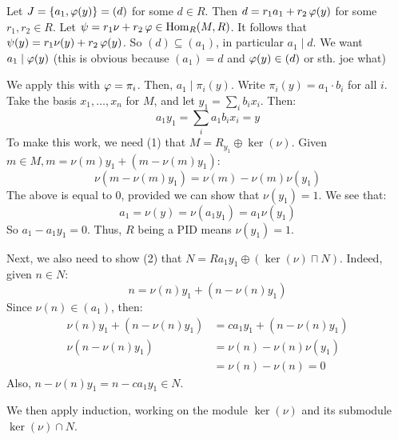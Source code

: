 \begin{pf}[source=Primary Source Material]
    Let $ J = \left\{{a_{1}, \operatorname{\varphi}(y)}\right\} = (d) $ for some $ d \in R $.
    Then $ d = r_{1}a_{1} + r_{2}\operatorname{\varphi}(y) $ for some $ r_{1}, r_{2} \in R $.
    \vsp
    Let $ \psi = r_{1}\nu + r_{2}\operatorname{\varphi} \in \operatorname{Hom}_{R}(M, R) $.
    It follows that $ \psi(y) = r_{1}\nu(y) + r_{2}\operatorname{\varphi}(y) $.
    So $ (d) \subseteq (a_{1}) $, in particular $ a_{1} \mid d $. \vsp
    We want $ a_{1} \mid \operatorname{\varphi}(y) $ (this is obvious because $ (a_{1}) = d $ and $ \operatorname{\varphi}(y) \in (d) $ or sth. joe what)
\end{pf}

We apply this with $ \operatorname{\varphi} = \pi_{i} $. Then, $ a_{1} \mid \pi_{i}(y) $.
Write $ \pi_{i}(y) = a_{1}\cdot b_{i} $ for all $ i $.
Take the basis $ x_{1}, \dots, x_{n} $ for $ M $, and let $ y_{1} =
\sum_{i} b_{i}x_{i} $. Then:
\begin{equation*}
    a_{1}y_{1} = \sum_{i}a_{1}b_{i}x_{i} = y
\end{equation*}
To make this work, we need (1) that $ M = R_{y_{1}} \oplus \ker(\nu) $.
Given $ m \in M, m = \nu(m)y_{1} + (m - \nu(m)y_{1}) $:
\begin{equation*}
    \nu(m - \nu(m)y_{1}) = \nu(m)-\nu(m)\nu(y_{1})
\end{equation*}
The above is equal to 0, provided we can show that $ \nu(y_{1}) = 1 $.
We see that:
\begin{equation*}
    a_{1} = \nu(y) = \nu(a_{1}y_{1}) = a_{1}\nu(y_{1})
\end{equation*}
So $ a_{1} - a_{1}y_{1} = 0 $. Thus, $ R $ being a PID means $ \nu(y_{1}) = 1 $.

Next, we also need to show (2) that $ N = Ra_{1}y_{1} \oplus
(\ker(\nu)\sqcap N) $. Indeed, given $ n \in N $:
\begin{equation*}
    n = \nu(n)y_{1} + (n - \nu(n)y_{1})
\end{equation*}
Since $ \nu(n) \in (a_{1}) $, then:
\begin{align*}
    \nu(n)y_{1} + (n - \nu(n)y_{1}) & = ca_{1}y_{1} + (n - \nu(n)y_{1}) \\
    \nu(n - \nu(n)y_{1}) & = \nu(n) - \nu(n)\nu(y_{1}) \\
                                    & = \nu(n)-\nu(n) = 0
\end{align*}
Also, $ n - \nu(n)y_{1} = n-ca_{1}y_{1} \in N $.

We then apply induction, working on the module $ \ker(\nu) $ and its submodule
$ \ker(\nu) \cap N $.

